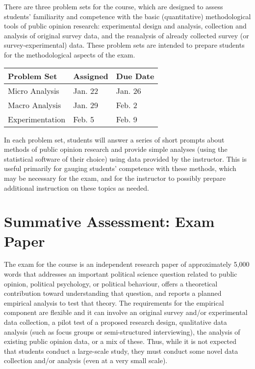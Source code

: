 \documentclass[12pt,a4paper]{article}
\begin{document}
There are three problem sets for the course, which are designed to assess students' familiarity and competence with the basic (quantitative) methodological tools of public opinion research: experimental design and analysis, collection and analysis of original survey data, and the reanalysis of already collected survey (or survey-experimental) data. These problem sets are intended to prepare students for the methodological aspects of the exam.

\begin{center}
\begin{tabular}{lll} \hline
\textbf{Problem Set} & \textbf{Assigned} & \textbf{Due Date} \\ \hline
Micro Analysis & Jan. 22 & Jan. 26 \\
Macro Analysis & Jan. 29 & Feb. 2 \\
Experimentation & Feb. 5 & Feb. 9 \\ \hline
\end{tabular}
\end{center}

In each problem set, students will answer a series of short prompts about methods of public opinion research and provide simple analyses (using the statistical software of their choice) using data provided by the instructor. This is useful primarily for gauging students' competence with these methods, which may be necessary for the exam, and for the instructor to possibly prepare additional instruction on these topics as needed.


\section{Summative Assessment: Exam Paper}

The exam for the course is an independent research paper of approximately 5,000 words that addresses an important political science question related to public opinion, political psychology, or political behaviour, offers a theoretical contribution toward understanding that question, and reports a planned empirical analysis to test that theory. The requirements for the empirical component are flexible and it can involve an original survey and/or experimental data collection, a pilot test of a proposed research design, qualitative data analysis (such as focus groups or semi-structured interviewing), the analysis of existing public opinion data, or a mix of these. Thus, while it is not expected that students conduct a large-scale study, they must conduct some novel data collection and/or analysis (even at a very small scale).
\end{document}
